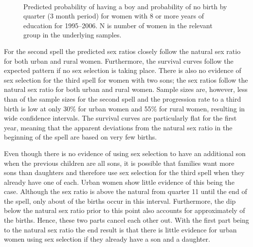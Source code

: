 \documentclass[12pt,letterpaper]{article}
\begin{document}
\begin{figure}[htpb]
{\begin{minipage}{0.30\textwidth}
        \\
        \captionsetup[subfigure]{labelformat=parens}
    \end{minipage}
}
\setcounter{subfigure}{3}
\caption{Predicted probability of having a boy and probability of
no birth by quarter (3 month period) for women with 8 or more years
of education for 1995--2006. 
N is number of women in the relevant group in the underlying samples.
}
\label{fig:boys_latest}
\end{figure}


For the second spell the predicted sex ratios closely follow the natural sex 
ratio for both urban and rural women.
Furthermore, the survival curves follow the expected pattern if no sex selection 
is taking place.
There is also no evidence of sex selection for the third spell for women with two sons;
the sex ratios follow the natural sex ratio for both urban and rural women.
Sample sizes are, however, less than  of the sample sizes for the second 
spell and the progression rate to a third birth is low at only 30\% for urban women and 
55\% for rural women, resulting in wide confidence intervals.
The survival curves are particularly flat for the first year, meaning that the apparent 
deviations from the natural sex ratio in the beginning of the spell are based on very few births.


Even though there is no evidence of using sex selection to have an additional son when the 
previous children are all sons, it is possible that families want more sons than daughters 
and therefore use sex selection for the third spell when they already have one of each.
Urban women show little evidence of this being the case.
Although the sex ratio is above the natural from quarter 11 until the end of the spell,
only about  of the births occur in this interval.
Furthermore, the dip below the natural sex ratio prior to this point also accounts for
approximately  of the births.
Hence, these two parts cancel each other out.
With the first part being to the natural sex ratio the end result is that there
is little evidence for urban women using sex selection if they already have a son and
a daughter.
\end{document}
